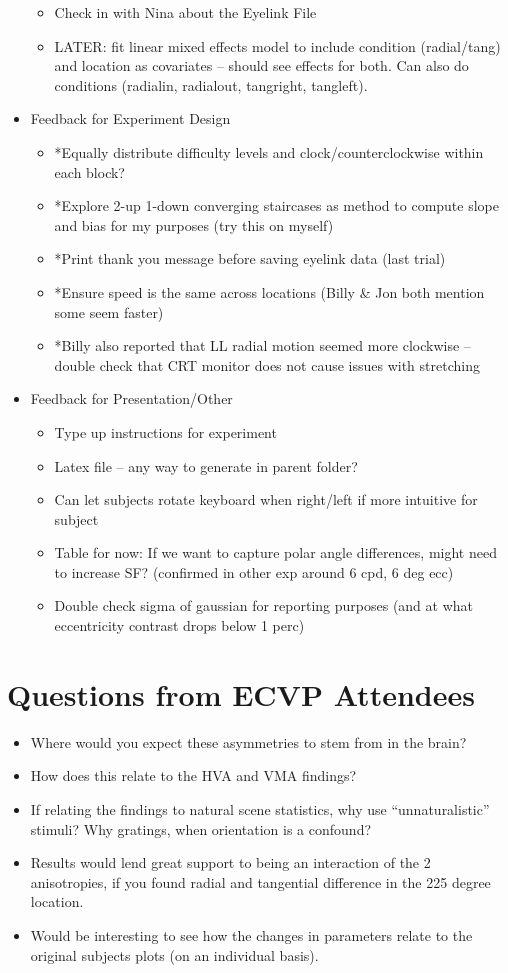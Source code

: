 \documentclass[11pt]{article} %
\begin{document}
\begin{itemize}
\begin{itemize}
	\item Check in with Nina about the Eyelink File
	\item LATER: fit linear mixed effects model to include condition (radial/tang) and location as covariates -- should see effects for both. Can also do conditions (radialin, radialout, tangright, tangleft).
	\end{itemize}
\item Feedback for Experiment Design
	\begin{itemize}
	\item *Equally distribute difficulty levels and clock/counterclockwise within each block?
	\item *Explore 2-up 1-down converging staircases as method to compute slope and bias for my purposes (try this on myself)
	\item *Print thank you message before saving eyelink data (last trial)
	\item *Ensure speed is the same across locations (Billy \& Jon both mention some seem faster)
	\item *Billy also reported that LL radial motion seemed more clockwise -- double check that CRT monitor does not cause issues with stretching
	\end{itemize}
\item Feedback for Presentation/Other
	\begin{itemize}
	\item Type up instructions for experiment
	\item Latex file -- any way to generate in parent folder?
	\item Can let subjects rotate keyboard when right/left if more intuitive for subject
	\item Table for now: If we want to capture polar angle differences, might need to increase SF? (confirmed in other exp around 6 cpd, 6 deg ecc)
	\item Double check sigma of gaussian for reporting purposes (and at what eccentricity contrast drops below 1 perc)
	\end{itemize}
\end{itemize}

\section{Questions from ECVP Attendees} 
\begin{itemize}
\item Where would you expect these asymmetries to stem from in the brain?
\item How does this relate to the HVA and VMA findings?
\item If relating the findings to natural scene statistics, why use “unnaturalistic” stimuli? Why gratings, when orientation is a confound?
\item Results would lend great support to being an interaction of the 2 anisotropies, if you found radial and tangential difference in the 225 degree location.
\item Would be interesting to see how the changes in parameters relate to the original subjects plots (on an individual basis).
\end{itemize}
\end{document}

